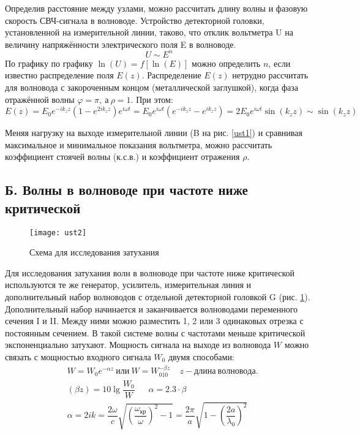 \documentclass{lab}
\begin{document}
Определив расстояние между узлами, можно рассчитать длину волны и фазовую скорость СВЧ-сигнала в
волноводе. Устройство детекторной головки, установленной на измерительной линии,
таково, что отклик вольтметра U на величину напряжённости электрического поля E в волноводе.
$$ U \sim E^n $$
По графику по графику $\ln(U) = f[\ln(E)]$ можно определить $n$, если известно распределение
поля $E(z)$. Распределение $E(z)$ нетрудно рассчитать для волновода с закороченным
концом (металлической заглушкой), когда фаза отражённой волны $\varphi = \pi,~а~\rho = 1$. При этом:
$$ E(z) = E_0e^{-ik_zz}(1 - e^{2ik_zz})e^{i\omega t} = E_0e^{i\omega t}(e^{-ik_zz}-e^{ik_zz})
= 2E_0e^{i\omega t}\sin(k_zz) \sim \sin(k_zz) $$

Меняя нагрузку на выходе измерительной линии (B на рис. \ref{ust1})
и сравнивая максимальное и минимальное показания вольтметра, можно
рассчитать коэффициент стоячей волны (к.с.в.) и коэффициент отражения $\rho$.

\subsection*{Б. Волны в волноводе при частоте ниже критической}

\begin{figure}[H]
	\centering
	\texttt{[image: ust2]}
	\caption{\footnotesize
		Схема для исследования затухания
	}
	\label{ust2}
\end{figure}

Для исследования затухания волн в волноводе при частоте ниже критической используются те
же генератор, усилитель, измерительная линия и дополнительный набор волноводов с отдельной детекторной головкой
G (рис. \ref{ust2}). Дополнительный набор начинается и заканчивается волноводами
переменного сечения I и II. Между ними можно разместить 1, 2 или 3 одинаковых отрезка с постоянным сечением.
В такой системе волны с частотами меньше критической экспоненциально затухают.
Мощность сигнала на выходе из волновода $W$ можно связать с мощностью входного сигнала
$W_0$ двумя способами:
\begin{equation}
\begin{aligned}
&W = W_0e^{-\alpha z} ~или~ W = W_010^{-\beta z} ~~~~~ z - длина ~ волновода.\\
&(\beta z) = 10 \lg \dfrac{W_0}{W} ~~~~~~~ \alpha = 2.3 \cdot \beta\\
&\alpha = 2ik = \dfrac{2\omega}{c}\sqrt{\left(\dfrac{\omega_{кр}}{\omega}\right)^2 - 1} = 
\dfrac{2\pi}{a}\sqrt{1 - \left(\dfrac{2a}{\lambda_0}\right)^2}
\end{aligned}
\end{equation}
\end{document}
